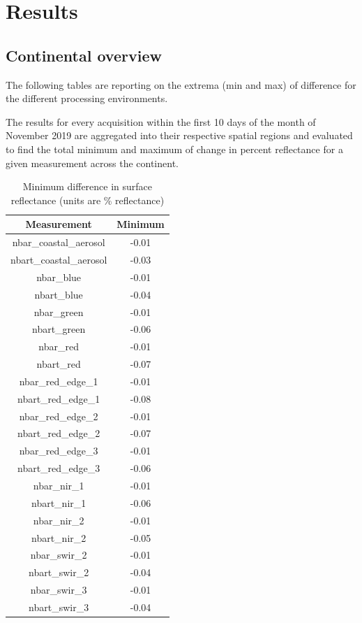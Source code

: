 \documentclass[a4paper]{article}
\begin{document}
  \newpage

  \section{Results}

    \subsection{Continental overview}

    \begin{flushleft}
      The following tables are reporting on the extrema (min and max) of difference for the different processing environments. \par
      The results for every acquisition within the first 10 days of the month of November 2019 are aggregated into their respective spatial regions and evaluated to find the total minimum and maximum of change in percent reflectance for a given measurement across the continent. \par
    \end{flushleft}

    \begin{table}[ht!]
      \caption{Minimum difference in surface reflectance (units are \% reflectance)}\label{table:1}
      \centering
      \begin{tabular}{cc} \midrule
        \textbf{Measurement} & \textbf{Minimum} \\ \midrule
        nbar\_coastal\_aerosol & -0.01 \\
        nbart\_coastal\_aerosol & -0.03 \\
        nbar\_blue & -0.01 \\
        nbart\_blue & -0.04 \\
        nbar\_green & -0.01 \\
        nbart\_green & -0.06 \\
        nbar\_red & -0.01 \\
        nbart\_red & -0.07 \\
        nbar\_red\_edge\_1 & -0.01 \\
        nbart\_red\_edge\_1 & -0.08 \\
        nbar\_red\_edge\_2 & -0.01 \\
        nbart\_red\_edge\_2 & -0.07 \\
        nbar\_red\_edge\_3 & -0.01 \\
        nbart\_red\_edge\_3 & -0.06 \\
        nbar\_nir\_1 & -0.01 \\
        nbart\_nir\_1 & -0.06 \\
        nbar\_nir\_2 & -0.01 \\
        nbart\_nir\_2 & -0.05 \\
        nbar\_swir\_2 & -0.01 \\
        nbart\_swir\_2 & -0.04 \\
        nbar\_swir\_3 & -0.01 \\
        nbart\_swir\_3 & -0.04 \\ \midrule
      \end{tabular}
    \end{table}
\end{document}
